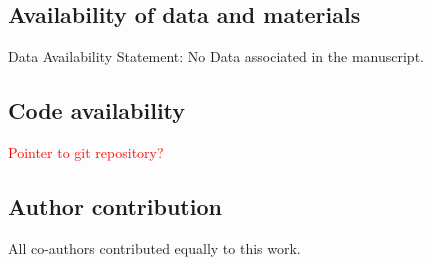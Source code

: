 \documentclass[sn-mathphys-num,a4paper,iicol,lineno,pdflatex]{sn-jnl-hacked}
\theoremstyle{thmwithspace}%
\theoremstyle{thmwithspace}%
\begin{document}
\subsection*{Availability of data and materials}
Data Availability Statement: No Data associated in the manuscript.

\subsection*{Code availability}

\textcolor{red}{Pointer to git repository?}

\subsection*{Author contribution}

All co-authors contributed equally to this work.

\begin{appendices}



\end{appendices}

\clearpage


\end{document}
